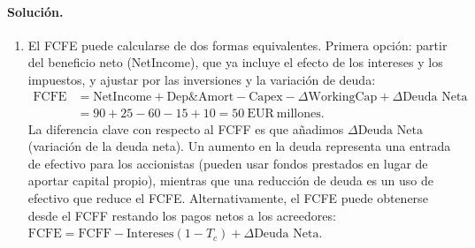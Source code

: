 \documentclass[12pt,a4paper]{article}
\newcommand{\EUR}[1]{\ensuremath{#1~\text{EUR}}}
\newenvironment{solucion}{\paragraph{Solución.}}{}
\begin{document}
\begin{solucion}
\begin{enumerate}[label=\alph*)]
  \item El FCFE puede calcularse de dos formas equivalentes. Primera opción: partir del beneficio neto (NetIncome), que ya incluye el efecto de los intereses y los impuestos, y ajustar por las inversiones y la variación de deuda:
  \begin{align*}
  \text{FCFE} &= \text{NetIncome} + \text{Dep\&Amort} - \text{Capex} - \Delta\text{WorkingCap} + \Delta\text{Deuda Neta}\\
              &= 90 + 25 - 60 - 15 + 10 = \EUR{50}~\text{millones}.
  \end{align*}
  La diferencia clave con respecto al FCFF es que añadimos $\Delta\text{Deuda Neta}$ (variación de la deuda neta). Un aumento en la deuda representa una entrada de efectivo para los accionistas (pueden usar fondos prestados en lugar de aportar capital propio), mientras que una reducción de deuda es un uso de efectivo que reduce el FCFE. Alternativamente, el FCFE puede obtenerse desde el FCFF restando los pagos netos a los acreedores: $\text{FCFE} = \text{FCFF} - \text{Intereses}(1-T_c) + \Delta\text{Deuda Neta}$.
\end{enumerate}
\end{solucion}
\end{document}
